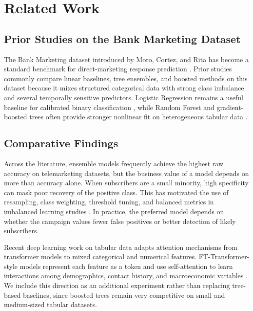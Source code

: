 \documentclass[10pt,twocolumn]{article}
\begin{document}
\section{Related Work}

\subsection{Prior Studies on the Bank Marketing Dataset}
The Bank Marketing dataset introduced by Moro, Cortez, and Rita has become a standard benchmark for direct-marketing response prediction \cite{moro2014}. Prior studies commonly compare linear baselines, tree ensembles, and boosted methods on this dataset because it mixes structured categorical data with strong class imbalance and several temporally sensitive predictors. Logistic Regression remains a useful baseline for calibrated binary classification \cite{hosmer}, while Random Forest and gradient-boosted trees often provide stronger nonlinear fit on heterogeneous tabular data \cite{breiman_random_forests,xgboost,lightgbm}.

\subsection{Comparative Findings}
Across the literature, ensemble models frequently achieve the highest raw accuracy on telemarketing datasets, but the business value of a model depends on more than accuracy alone. When subscribers are a small minority, high specificity can mask poor recovery of the positive class. This has motivated the use of resampling, class weighting, threshold tuning, and balanced metrics in imbalanced learning studies \cite{smote,imbalanced}. In practice, the preferred model depends on whether the campaign values fewer false positives or better detection of likely subscribers.

Recent deep learning work on tabular data adapts attention mechanisms from transformer models \cite{attention} to mixed categorical and numerical features. FT-Transformer-style models represent each feature as a token and use self-attention to learn interactions among demographics, contact history, and macroeconomic variables \cite{fttransformer}. We include this direction as an additional experiment rather than replacing tree-based baselines, since boosted trees remain very competitive on small and medium-sized tabular datasets.
\end{document}
